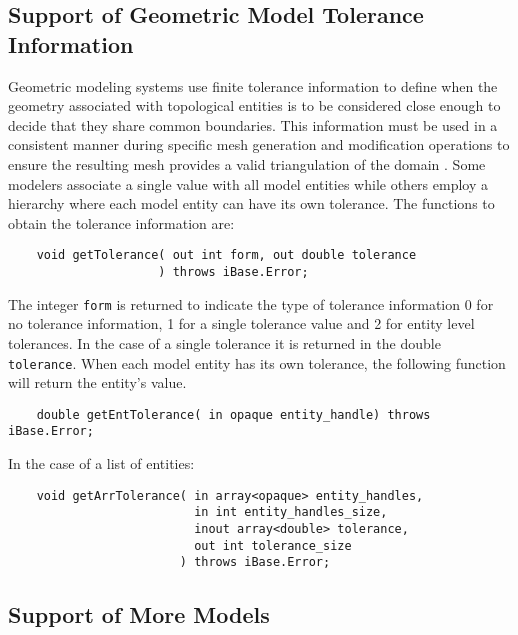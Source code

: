 \documentclass{article}
\begin{document}
\subsection{Support of Geometric Model Tolerance Information}

Geometric modeling systems use finite tolerance information 
to define when the geometry associated with topological entities 
is to be considered close enough to decide that they share common 
boundaries. This information must be used in a consistent manner 
during specific mesh generation and modification operations to 
ensure the resulting mesh provides a valid triangulation of the 
domain \cite{r21, r23}. Some modelers associate a single value with 
all model entities while others employ a hierarchy where each 
model entity can have its own tolerance. The functions to obtain 
the tolerance information are:

\begin{verbatim}
    void getTolerance( out int form, out double tolerance
                     ) throws iBase.Error;
\end{verbatim}
The integer {\tt form} is returned to indicate the type 
of tolerance information 0 for no tolerance information, 1 for 
a single tolerance value and 2 for entity level tolerances. In 
the case of a single tolerance it is returned in the double {\tt tolerance}. 
When each model entity has its own tolerance, the following function 
will return the entity's value.

\begin{verbatim}
    double getEntTolerance( in opaque entity_handle) throws iBase.Error; 
\end{verbatim}

\hspace{-16pt}In the case of a list of entities:

\begin{verbatim}
    void getArrTolerance( in array<opaque> entity_handles, 
                          in int entity_handles_size, 
                          inout array<double> tolerance, 
                          out int tolerance_size
                        ) throws iBase.Error;
\end{verbatim}


\subsection{Support of More Models}
\end{document}
